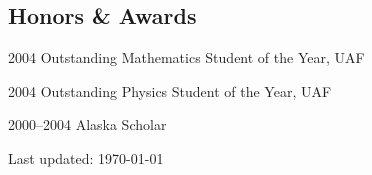 \documentclass[10pt,letterpaper]{article}
\renewenvironment{itemize}{
  \begin{list}{}{
    \setlength{\leftmargin}{1.5em}
    \setlength{\itemsep}{0.25em}
    \setlength{\parskip}{0pt}
    \setlength{\parsep}{0.25em}
  }
}{
  \end{list}
}
\begin{document}
\subsection*{Honors \& Awards}
\begin{itemize}
\item 2004 Outstanding Mathematics Student of the Year, UAF
\item 2004 Outstanding Physics Student of the Year, UAF
\item 2000--2004 Alaska Scholar
\end{itemize}

\begin{center}
  \begin{small}
    Last updated: \today
  \end{small}
\end{center}
\end{document}
